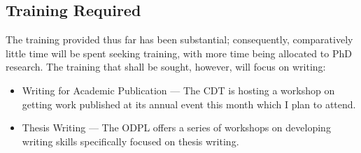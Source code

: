 \subsection{Training Required}\label{sub:training:required}

The training provided thus far has been substantial; consequently, comparatively
little time will be spent seeking training, with more time being allocated to
PhD research.
The training that shall be sought, however, will focus on writing:
\begin{itemize}
    \item Writing for Academic Publication --- The CDT is hosting a workshop on
        getting work published at its annual event this month which I plan to
        attend.
    \item Thesis Writing --- The ODPL offers a series of workshops on developing
        writing skills specifically focused on thesis writing.
\end{itemize}
